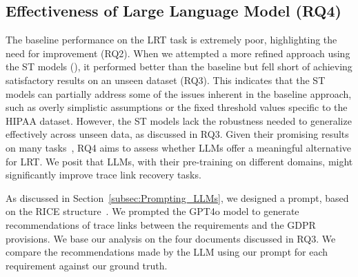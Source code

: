\subsection{Effectiveness of Large Language Model (RQ4) } \label{subsec:rq4}

The baseline performance on the LRT task is extremely poor, highlighting the need for improvement (RQ2). When we attempted a more refined approach using the ST models (\kashif), it performed better than the baseline but fell short of achieving satisfactory results on an unseen dataset (RQ3). This indicates that the ST models can partially address some of the issues inherent in the baseline approach, such as overly simplistic assumptions or the fixed threshold values specific to the HIPAA dataset. However, the ST models lack the robustness needed to generalize effectively across unseen data, as discussed in RQ3. Given their promising results on many tasks~\cite{AroraHH24,abs_2310_18648}, RQ4 aims to assess whether LLMs offer a meaningful alternative for LRT. We posit that LLMs, with their pre-training on different domains, might significantly improve trace link recovery tasks.

 As discussed in Section~\ref{subsec:Prompting_LLMs}, we designed a prompt, based on the RICE structure~\cite{vogelsang2024using}. We prompted the GPT4o model to generate recommendations of trace links between the requirements and the GDPR provisions. We base our analysis on the four documents discussed in RQ3. We compare the recommendations made by the LLM using our prompt for each requirement against our ground truth. 


